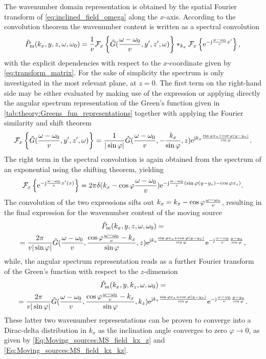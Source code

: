 The wavenumber domain representation is obtained by the spatial Fourier transform of \eqref{eq:inclined_field_omega} along the $x$-axis.
According to the convolution theorem the wavenumber content is written as a spectral convolution
\begin{equation}
\tilde{P}_{\mathrm{m}}(k_x,y,z,\omega,\omega_0) =
\frac{1}{v}
\mathcal{F}_x \left\{
\tilde{G}(\frac{\omega-\omega_0}{v}, y', z', \omega) \right\}
\ast_{k_x}
\mathcal{F}_x \left\{
\mathrm{e}^{-\mathrm{j} \frac{\omega-\omega_0}{v} x' }
 \right\},
\end{equation}
with the explicit dependencies with respect to the $x$-coordinate given by \eqref{eq:transform_matrix}.
For the sake of simplicity the spectrum is only investigated in the most relevant plane, at $z = 0$.
The first term on the right-hand side may be either evaluated by making use of the expression \cite[(6.677,9.)]{Gradshteyn2007} or applying directly the angular spectrum representation of the Green's function given in \eqref{tab:theory:Greens_fun_representations} together with applying the Fourier similarity and shift theorem
\begin{equation}
\mathcal{F}_x \left\{
\tilde{G}(\frac{\omega-\omega_0}{v}, y', z', \omega) \right\} =
\frac{1}{|\sin\varphi|} \tilde{G}( \frac{\omega-\omega_0}{v}, - \frac{k_x}{\sin\varphi} , z ) \mathrm{e}^{\mathrm{j} k_x \frac{\sin\varphi x_s + \cos\varphi (y-y_s)}{\sin\varphi}}.
\end{equation}
The right term in the spectral convolution is again obtained from the spectrum of an exponential using the shifting theorem, yielding
\begin{equation}
\mathcal{F}_x \left\{
\mathrm{e}^{-\mathrm{j} \frac{\omega-\omega_0}{v} x'(x)}
 \right\} = 2\pi \delta(k_x - \cos\varphi \frac{\omega-\omega_0}{v}) \mathrm{e}^{-\mathrm{j} \frac{\omega-\omega_0}{v}\left( \sin\varphi(y-y_s) - \cos\varphi x_s \right)}.
\end{equation}
The convolution of the two expressions sifts out $k_x = k_x - \cos\varphi \frac{\omega-\omega_0}{v}$, resulting in the final expression for the wavenumber content of the moving source
\begin{multline}
\tilde{P}_{\mathrm{m}}(k_x,y,z,\omega,\omega_0) = \\ =
\frac{2\pi}{v|\sin\varphi|} \tilde{G}( \frac{\omega-\omega_0}{v}, \frac{\cos\varphi \frac{\omega-\omega_0}{v}- k_x }{\sin\varphi} , z )  
\mathrm{e}^{\mathrm{j} k_x\frac{\sin\varphi x_s + \cos\varphi (y-y_s)}{\sin\varphi}}
\mathrm{e}^{-\mathrm{j} \frac{\omega-\omega_0}{v} \frac{y-y_s}{\sin\varphi}},
\end{multline}
while, the angular spectrum representation reads as a further Fourier transform of the Green's function with respect to the $z$-dimension
\begin{multline}
\tilde{P}_{\mathrm{m}}(k_x,y,k_z,\omega,\omega_0) = \\ =
\frac{2\pi}{v|\sin\varphi|} \tilde{G}( \frac{\omega-\omega_0}{v}, \frac{\cos\varphi \frac{\omega-\omega_0}{v}- k_x }{\sin\varphi} , k_z )  
\mathrm{e}^{\mathrm{j} k_x\frac{\sin\varphi x_s + \cos\varphi (y-y_s)}{\sin\varphi}}
\mathrm{e}^{-\mathrm{j} \frac{\omega-\omega_0}{v} \frac{y-y_s}{\sin\varphi}}.
\end{multline}
These latter two wavenumber representations can be proven to converge into a Dirac-delta distribution in $k_x$ as the inclination angle converges to zero $\varphi \rightarrow 0$, as given by \eqref{Eq:Moving_sources:MS_field_kx_z} and \eqref{Eq:Moving_sources:MS_field_kx_kz}.